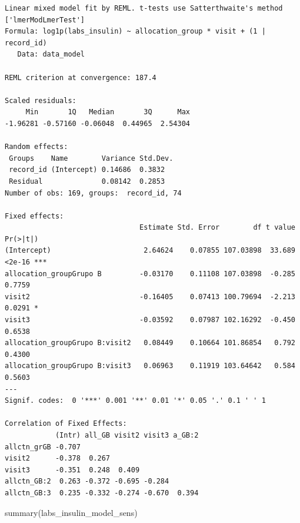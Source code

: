 \documentclass[
  12pt,
]{article}
\newenvironment{Shaded}{\begin{snugshade}}{\end{snugshade}}
\newcommand{\FunctionTok}[1]{\textcolor[rgb]{0.28,0.35,0.67}{#1}}
\newcommand{\NormalTok}[1]{\textcolor[rgb]{0.00,0.23,0.31}{#1}}
\begin{document}
\begin{verbatim}
Linear mixed model fit by REML. t-tests use Satterthwaite's method ['lmerModLmerTest']
Formula: log1p(labs_insulin) ~ allocation_group * visit + (1 | record_id)
   Data: data_model

REML criterion at convergence: 187.4

Scaled residuals: 
     Min       1Q   Median       3Q      Max 
-1.96281 -0.57160 -0.06048  0.44965  2.54304 

Random effects:
 Groups    Name        Variance Std.Dev.
 record_id (Intercept) 0.14686  0.3832  
 Residual              0.08142  0.2853  
Number of obs: 169, groups:  record_id, 74

Fixed effects:
                                Estimate Std. Error        df t value Pr(>|t|)    
(Intercept)                      2.64624    0.07855 107.03898  33.689   <2e-16 ***
allocation_groupGrupo B         -0.03170    0.11108 107.03898  -0.285   0.7759    
visit2                          -0.16405    0.07413 100.79694  -2.213   0.0291 *  
visit3                          -0.03592    0.07987 102.16292  -0.450   0.6538    
allocation_groupGrupo B:visit2   0.08449    0.10664 101.86854   0.792   0.4300    
allocation_groupGrupo B:visit3   0.06963    0.11919 103.64642   0.584   0.5603    
---
Signif. codes:  0 '***' 0.001 '**' 0.01 '*' 0.05 '.' 0.1 ' ' 1

Correlation of Fixed Effects:
            (Intr) all_GB visit2 visit3 a_GB:2
allctn_grGB -0.707                            
visit2      -0.378  0.267                     
visit3      -0.351  0.248  0.409              
allctn_GB:2  0.263 -0.372 -0.695 -0.284       
allctn_GB:3  0.235 -0.332 -0.274 -0.670  0.394
\end{verbatim}

\begin{Shaded}
\begin{Highlighting}[]
\FunctionTok{summary}\NormalTok{(labs\_insulin\_model\_sens)}
\end{Highlighting}
\end{Shaded}
\end{document}
